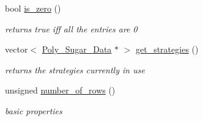 \begin{Indent}
\begin{DoxyCompactItemize}
bool \hyperlink{group___g_b_computation_aee8c1358071a26e60b2e50f9678dcfb0}{is\+\_\+zero} ()
\begin{DoxyCompactList}\small\item\em returns {\ttfamily true} iff all the entries are 0 \end{DoxyCompactList}\item 
\mbox{\label{group___g_b_computation_a1e58764d1bee3437e2bfa74fbb847b1a}} 
vector$<$ \hyperlink{group__strategygroup_class_poly___sugar___data}{Poly\+\_\+\+Sugar\+\_\+\+Data} $\ast$ $>$ \hyperlink{group___g_b_computation_a1e58764d1bee3437e2bfa74fbb847b1a}{get\+\_\+strategies} ()
\begin{DoxyCompactList}\small\item\em returns the strategies currently in use \end{DoxyCompactList}\item 
\mbox{\label{group___g_b_computation_ac56c717e4015d655e40b2c8033fa9d92}} 
unsigned \hyperlink{group___g_b_computation_ac56c717e4015d655e40b2c8033fa9d92}{number\+\_\+of\+\_\+rows} ()
\begin{DoxyCompactList}\small\item\em basic properties \end{DoxyCompactList}\end{DoxyCompactItemize}
\end{Indent}
